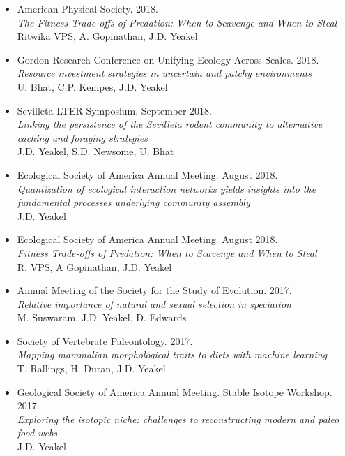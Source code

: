 \documentclass[margin,line,12pt]{res}
\begin{document}
\begin{resume}
\begin{itemize}
\item American Physical Society. 2018.\\
\emph{The Fitness Trade-offs of Predation: When to Scavenge and When to Steal}\\
Ritwika VPS, A. Gopinathan, J.D. Yeakel

\item Gordon Research Conference on Unifying Ecology Across Scales. 2018.\\
\emph{Resource investment strategies in uncertain and patchy environments}\\
U. Bhat, C.P. Kempes, J.D. Yeakel

\item Sevilleta LTER Symposium. September 2018.\\
\emph{Linking the persistence of the Sevilleta rodent community to alternative caching and foraging strategies}\\
J.D. Yeakel, S.D. Newsome, U. Bhat

\item Ecological Society of America Annual Meeting. August 2018.\\
\emph{Quantization of ecological interaction networks yields insights into the fundamental processes underlying community assembly}\\
J.D. Yeakel

\item Ecological Society of America Annual Meeting. August 2018.\\
\emph{Fitness Trade-offs of Predation: When to Scavenge and When to Steal}\\
R. VPS, A Gopinathan, J.D. Yeakel

\item Annual Meeting of the Society for the Study of Evolution. 2017.\\
\emph{Relative importance of natural and sexual selection in speciation}\\
M. Suswaram, J.D. Yeakel, D. Edwards

\item Society of Vertebrate Paleontology. 2017.\\
\emph{Mapping mammalian morphological traits to diets with machine learning}\\
T. Rallings, H. Duran, J.D. Yeakel

\item Geological Society of America Annual Meeting. Stable Isotope Workshop. 2017.\\
\emph{Exploring the isotopic niche: challenges to reconstructing modern and paleo food
webs}\\
J.D. Yeakel


\end{itemize}
\end{resume}
\end{document}
